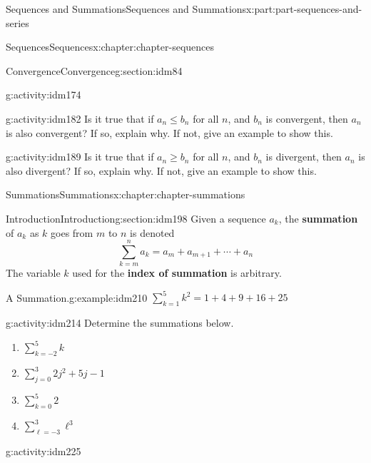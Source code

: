 \documentclass[oneside,10pt,]{book}
\newcommand{\terminology}[1]{\textbf{#1}}
\numberwithin{equation}{section}
\begin{document}
\begin{partptx}{Sequences and Summations}{}{Sequences and Summations}{}{}{x:part:part-sequences-and-series}
\begin{chapterptx}{Sequences}{}{Sequences}{}{}{x:chapter:chapter-sequences}
\begin{sectionptx}{Convergence}{}{Convergence}{}{}{g:section:idm84}
\begin{activity}{}{g:activity:idm174}
\end{activity}
\begin{activity}{}{g:activity:idm182}%
Is it true that if \(a_n \leq b_n\) for all \(n\), and \(b_n\) is convergent, then \(a_n\) is also convergent? If so, explain why. If not, give an example to show this.%
\end{activity}
\begin{activity}{}{g:activity:idm189}%
Is it true that if \(a_n \geq b_n\) for all \(n\), and \(b_n\) is divergent, then \(a_n\) is also divergent? If so, explain why. If not, give an example to show this.%
\end{activity}
\end{sectionptx}
\end{chapterptx}
%
\typeout{************************************************}
\typeout{************************************************}
%
\begin{chapterptx}{Summations}{}{Summations}{}{}{x:chapter:chapter-summations}
%
%
\typeout{************************************************}
\typeout{************************************************}
%
\begin{sectionptx}{Introduction}{}{Introduction}{}{}{g:section:idm198}
Given a sequence \(a_k\), the \terminology{summation} of \(a_k\) as \(k\) goes from \(m\) to \(n\) is denoted%
\begin{equation*}
\sum_{k=m}^n a_k = a_m + a_{m+1} + \cdots + a_n
\end{equation*}
The variable \(k\) used for the \terminology{index of summation} is arbitrary.%
\begin{example}{A Summation.}{g:example:idm210}%
\(\displaystyle\sum_{k = 1}^5 k^2 = 1 + 4 + 9 + 16 + 25\)%
\end{example}
\begin{activity}{}{g:activity:idm214}%
Determine the summations below.%
\begin{enumerate}[font=\bfseries,label=(\alph*),ref=\alph*]
\item{}\(\displaystyle\sum_{k = -2}^5 k\)\item{}\(\displaystyle\sum_{j = 0}^3 2j^2+5j-1\)\item{}\(\displaystyle\sum_{k = 0}^5 2\)\item{}\(\displaystyle\sum_{\ell = -3}^3 \ell^3\)\end{enumerate}
\end{activity}
\begin{activity}{}{g:activity:idm225}%

\end{activity}
\end{sectionptx}
\end{chapterptx}
\end{partptx}
\end{document}
